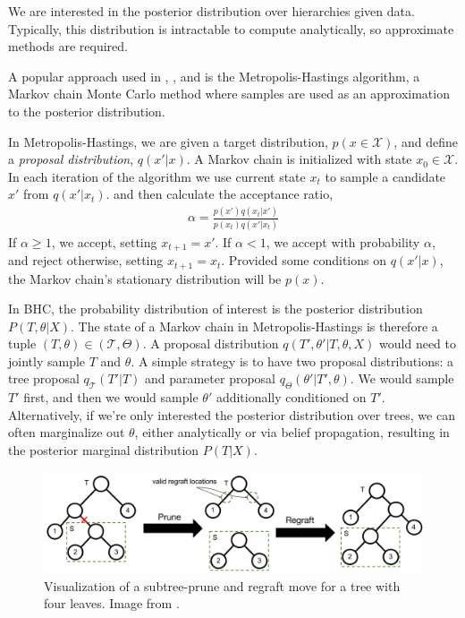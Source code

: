 \documentclass{article}
\begin{document}
We are interested
in the posterior distribution
over hierarchies given data.
Typically, this distribution
is intractable to compute
analytically, so approximate
methods are required.

A popular approach used
in \citep{Neal2003}, \citep{Knowles2015}, and \citep{Boyles2012}
is the Metropolis-Hastings
algorithm,
a Markov chain Monte Carlo
method where samples
are used as an approximation
to the posterior distribution.

In Metropolis-Hastings,
we are given a target
distribution, $p(x \in \mathcal{X})$, and
define a \emph{proposal distribution}, $q(x' | x)$.
A Markov chain is initialized with state $x_0 \in \mathcal{X}$.
In each iteration of the algorithm
we use current state $x_t$
to sample a candidate $x'$ from $q(x' | x_t)$.
and then calculate
the acceptance ratio, 
\begin{align}
    \alpha = \frac{p(x')q(x_t | x')}{p(x_t)q(x' | x_t)}
\end{align}
If $\alpha \ge 1$, we accept,
setting $x_{t + 1} = x'$.
If $\alpha < 1$, we accept
with probability $\alpha$, and reject
otherwise, setting $x_{t + 1} = x_t$.
Provided some conditions on $q(x' | x)$,
the Markov chain's stationary distribution
will be $p(x)$.

In BHC, the probability distribution
of interest
is the posterior distribution $P(T, \theta | X)$.
The state of a Markov chain in Metropolis-Hastings is therefore
a tuple $(T, \theta) \in (\mathcal{T}, \Theta)$.
A proposal distribution $q(T', \theta' | T, \theta, X)$ would need to jointly
sample $T$ and $\theta$.
A simple strategy is to have two proposal distributions: a 
tree proposal $q_\mathcal{T}(T' | T)$
and parameter proposal $q_\Theta(\theta' | T', \theta)$. 
We would sample $T'$ first,
and then we would sample $\theta'$ 
additionally conditioned on $T'$.
Alternatively, if we're only interested
the posterior distribution over trees,
we can often marginalize out $\theta$, either
analytically or via belief propagation,
resulting in the posterior marginal
distribution $P(T | X)$.

\begin{figure}[t]
  \includegraphics[width=\textwidth]{img/spr}
  \caption{Visualization of a subtree-prune and regraft move for a
  tree with four leaves. Image from \citep{Vikram2016}.}
\label{fig:spr}
\end{figure}
\end{document}
